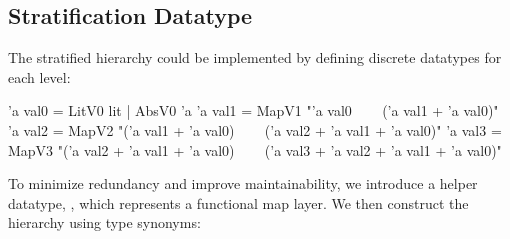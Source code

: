 \subsection{Stratification Datatype}
\label{sec:datatype-construction}
The stratified hierarchy could be implemented by defining discrete datatypes for each level:

\begin{isabellebody}\isanewline
{} 'a val0 = LitV0 lit | AbsV0 'a\isanewline
{} 'a val1 = MapV1 "'a val0 \isanewline
\ \ \ {\isasymRightarrow} ('a val1 + 'a val0)"\isanewline
{} 'a val2 = MapV2 "('a val1 + 'a val0) \isanewline
\ \ \ {\isasymRightarrow} ('a val2 + 'a val1 + 'a val0)"\isanewline
{} 'a val3 = MapV3 "('a val2 + 'a val1 + 'a val0)\isanewline
\ \ \ {\isasymRightarrow} ('a val3 + 'a val2 + 'a val1 + 'a val0)"\isanewline
\end{isabellebody}


To minimize redundancy and improve maintainability, we introduce a helper datatype, ,
which represents a functional map layer.
We then construct the hierarchy using type synonyms:

